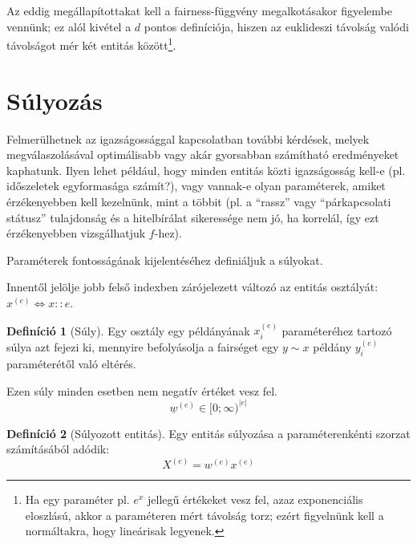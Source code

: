 \documentclass[twocolumn]{article}
\theoremstyle{definition}
\newtheorem{definition}{Definíció}[section]
\newcommand{\vect}[1]{ \underline{#1} }
\newcommand{\ent}[2]{ {#1}^{(#2)} }
\begin{document}
    Az eddig megállapítottakat kell a fairness-függvény megalkotásakor figyelembe vennünk; ez alól kivétel a $d$ pontos definíciója, hiszen az euklideszi távolság valódi távolságot mér két entitás között\footnote{Ha egy paraméter pl. $e^x$ jellegű értékeket vesz fel, azaz exponenciális eloszlású, akkor a paraméteren mért távolság torz; ezért figyelnünk kell a normáltakra, hogy lineárisak legyenek.}.
    

\section{Súlyozás}
    Felmerülhetnek az igazságossággal kapcsolatban további kérdések, melyek megválaszolásával optimálisabb vagy akár gyorsabban számítható eredményeket kaphatunk. Ilyen lehet például, hogy minden entitás közti igazságosság kell-e (pl. időszeletek egyformasága számít?), vagy vannak-e olyan paraméterek, amiket érzékenyebben kell kezelnünk, mint a többit (pl. a \enquote{rassz} vagy \enquote{párkapcsolati státusz} tulajdonság és a hitelbírálat sikeressége nem jó, ha korrelál, így ezt érzékenyebben vizsgálhatjuk $f$-hez).
    
    Paraméterek fontosságának kijelentéséhez definiáljuk a súlyokat.
    
    Innentől jelölje jobb felső indexben zárójelezett változó az entitás osztályát: $x^{(e)} \Leftrightarrow x::e$.
    
    \begin{definition}[Súly]
        Egy osztály egy példányának $\ent{x}{e}_i$ paraméteréhez tartozó súlya azt fejezi ki, mennyire befolyásolja a fairséget egy $y\sim x$ példány $\ent{y}{e}_i$ paraméterétől való eltérés. 
        
        Ezen súly minden esetben nem negatív értéket vesz fel.
        \begin{equation}
            \ent{\vect w}{e} \in [0;\infty)^{|e|}
        \end{equation}
    \end{definition}
    
    \begin{definition}[Súlyozott entitás]
        Egy entitás súlyozása a paraméterenkénti szorzat számításából adódik:
        \begin{equation}
            \ent X e = \ent w e \ent x e
        \end{equation}
    \end{definition}
    
\end{document}
